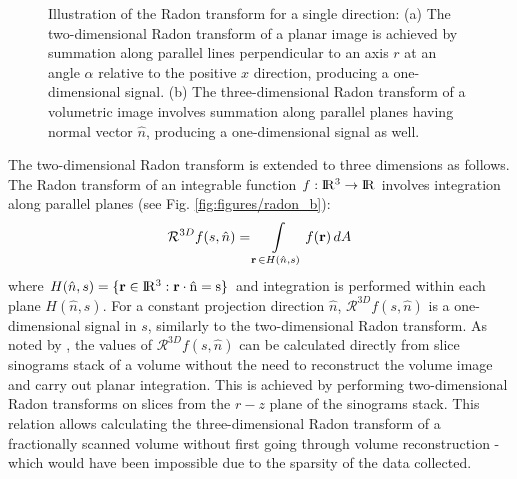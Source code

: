 \begin{figure}[t]
  \centering
  \hfill
  \caption{\small{Illustration of the Radon transform for a single direction: (a) The two-dimensional Radon transform of a planar image is achieved by summation along parallel lines perpendicular to an axis $r$ at an angle $\alpha$ relative to the positive $x$ direction, producing a one-dimensional signal. (b) The three-dimensional Radon transform of a volumetric image involves summation along parallel planes having normal vector $\hat{n}$, producing a one-dimensional signal as well.}}
    \label{fig:figures/radon}
\end{figure}


 The two-dimensional Radon transform is extended to three dimensions as follows. The Radon transform of an integrable function $f: \rm I\!R ^3 \rightarrow \rm I\!R $ involves integration along parallel planes (see Fig. \ref{fig:figures/radon_b}):
 \begin{equation}
    \mathcal{R}^{3D} f(s, \hat{n}) 
    = \int \displaylimits_{\textbf{r}\, \in H(\hat{n}, s)} f(\textbf{r})\, dA
 \end{equation}
 where $H(\hat{n}, s) = \{ \textbf{r} \in \rm I\!R ^3 : \textbf{r} \cdot \hat{n} = s\}$ and integration is performed within each plane $H(\hat{n}, s)$. For a constant projection direction $\hat{n}$, $\mathcal{R}^{3D} f(s, \hat{n})$ is a one-dimensional signal in $s$, similarly to the two-dimensional Radon transform. As noted by \cite{mooser2013estimation}, the values of $\mathcal{R}^{3D} f(s, \hat{n})$ can be calculated directly from slice sinograms stack of a volume without the need to reconstruct the volume image and carry out planar integration. This is achieved by performing two-dimensional Radon transforms on slices from the $r-z$ plane of the sinograms stack. This relation allows calculating the three-dimensional Radon transform of a fractionally scanned volume without first going through volume reconstruction - which would have been impossible due to the sparsity of the data collected.

